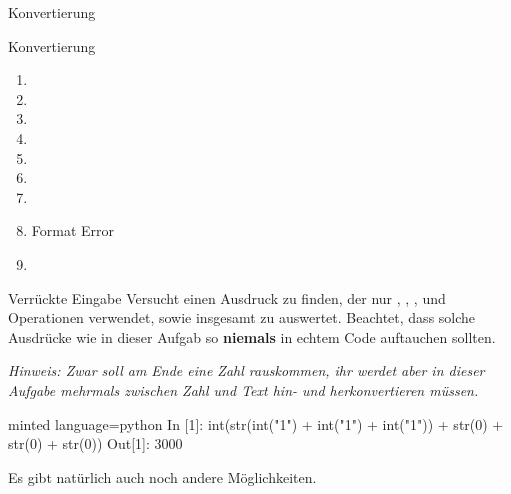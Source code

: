 \begin{task}[points=auto]{Konvertierung }
\begin{subtask*}[points=0]{Konvertierung}
        \begin{solution}
            \begin{multicols}{3}
                \begin{enumerate}
                    \item {}
                    \item {}
                    \item {}
                    \item {}
                    \item {}
                    \item {}
                    \item {}
                    \item Format Error
                    \item {}
                \end{enumerate}
            \end{multicols}
        \end{solution}
    \end{subtask*}
    \begin{subtask*}[points=0]{Verrückte Eingabe }
        Versucht einen Ausdruck zu finden,
        der nur , , , 
        und Operationen verwendet,
        sowie insgesamt zu  auswertet.
        Beachtet, dass solche Ausdrücke
        wie in dieser Aufgab so \textbf{niemals} in echtem Code auftauchen
        sollten.

        \textit{Hinweis: Zwar soll am Ende eine Zahl rauskommen, ihr werdet aber in dieser Aufgabe mehrmals zwischen Zahl und Text hin- und herkonvertieren müssen.}

        \begin{solution}
            \begin{codeBlock}[]{minted language=python}
                In [1]: int(str(int("1") + int("1") + int("1")) + str(0) + str(0) + str(0))
                Out[1]: 3000
            \end{codeBlock}
            Es gibt natürlich auch noch andere Möglichkeiten.
        \end{solution}
    \end{subtask*}
\end{task}
